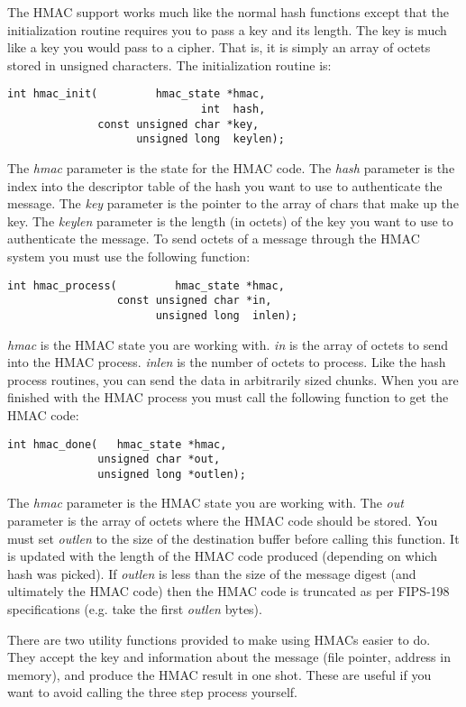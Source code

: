 \documentclass[synpaper]{book}
\begin{document}
The HMAC support works much like the normal hash functions except that the initialization routine requires you to pass a key
and its length.  The key is much like a key you would pass to a cipher.  That is, it is simply an array of octets stored in
unsigned characters.  The initialization routine is:
\begin{verbatim}
int hmac_init(         hmac_state *hmac,
                              int  hash,
              const unsigned char *key,
                    unsigned long  keylen);
\end{verbatim}
The \textit{hmac} parameter is the state for the HMAC code.  The \textit{hash} parameter is the index into the descriptor table of the hash you want
to use to authenticate the message.  The \textit{key} parameter is the pointer to the array of chars that make up the key.  The \textit{keylen} parameter is the
length (in octets) of the key you want to use to authenticate the message.  To send octets of a message through the HMAC system you must use the following function:
\begin{verbatim}
int hmac_process(         hmac_state *hmac,
                 const unsigned char *in,
                       unsigned long  inlen);
\end{verbatim}
\textit{hmac} is the HMAC state you are working with. \textit{in} is the array of octets to send into the HMAC process.  \textit{inlen} is the
number of octets to process.  Like the hash process routines, you can send the data in arbitrarily sized chunks. When you
are finished with the HMAC process you must call the following function to get the HMAC code:
\begin{verbatim}
int hmac_done(   hmac_state *hmac,
              unsigned char *out,
              unsigned long *outlen);
\end{verbatim}
The \textit{hmac} parameter is the HMAC state you are working with.  The \textit{out} parameter is the array of octets where the HMAC code should be stored.
You must set \textit{outlen} to the size of the destination buffer before calling this function.  It is updated with the length of the HMAC code
produced (depending on which hash was picked).  If \textit{outlen} is less than the size of the message digest (and ultimately
the HMAC code) then the HMAC code is truncated as per FIPS-198 specifications (e.g. take the first \textit{outlen} bytes).

There are two utility functions provided to make using HMACs easier to do.  They accept the key and information about the
message (file pointer, address in memory), and produce the HMAC result in one shot.  These are useful if you want to avoid
calling the three step process yourself.
\end{document}

